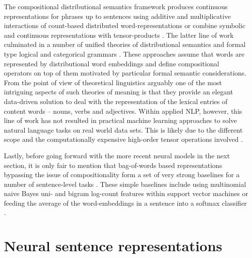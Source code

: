 The compositional distributional semantics  framework  produces
continuous representations for phrases up to sentences using additive and multiplicative interactions
of count-based distributed word-representations \citep{mitchell2008vector} or combine symbolic and
continuous representations with tensor-products \citep{clark2007combining}.
The latter line of work culminated in a number of unified theories of
distributional semantics and formal type logical and categorical grammars
\citep{coecke2010mathematical,clarke2012context,baroni2014frege}.
These approaches assume that words are represented by distributional word embeddings
and define compositional operators on top of them motivated by particular formal
semantic considerations. From the point of view of theoretical linguistics arguably
one of the most intriguing aspects of such theories of meaning is that
they provide an elegant data-driven solution to deal with the representation of the lexical entries of
content words -- nouns, verbs and adjectives.
Within applied NLP, however, this line of work has not resulted in
practical machine learning approaches to solve natural language tasks
on real world data sets. This is likely due to the different scope and
the computationally expensive high-order
tensor operations involved \citep{bowman2016modeling}.

Lastly, before going forward with the more recent neural models in the next section,
it is only fair to mention that bag-of-words
based representations bypassing the issue of compositionality form a set of very strong baselines
for a number of sentence-level tasks \citep{hill2016learning}.
These simple baselines include using multinomial naive Bayes uni- and bigram
log-count features within support vector machines \citep{wang2012baselines} or
feeding the average of the word-embeddings in a sentence into a softmax classifier \citep{joulin2016bag}.


\section{Neural sentence representations}
\label{sec:trans-sentence}

